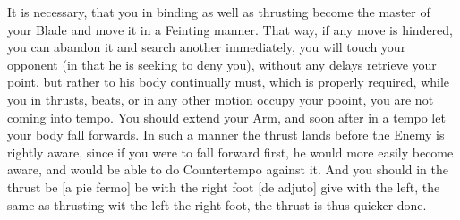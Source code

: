 It is necessary, that you in binding as well as thrusting become the
master of your Blade and move it in a Feinting manner. That way, if
any move is hindered, you can abandon it and search another
immediately, you will touch your opponent (in that he is seeking to
deny you), without any delays retrieve your point, but rather to his
body continually must, which is properly required, while you in
thrusts, beats, or in any other motion occupy your pooint, you are not
coming into tempo. You should extend your Arm, and soon after in a
tempo let your body fall forwards. In such a manner the thrust lands
before the Enemy is rightly aware, since if you were to fall forward
first, he would more easily become aware, and would be able to do
Countertempo against it. And you should in the thrust be [a pie fermo]
be with the right foot [de adjuto] give with the left, the same as
thrusting wit the left the right foot, the thrust is thus quicker done.


